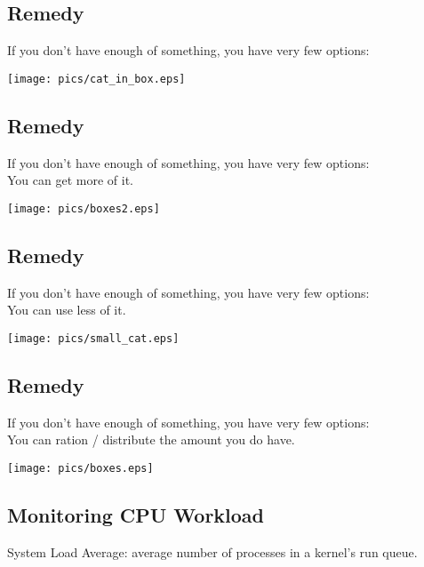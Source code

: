 \documentclass[xga]{xdvislides}
\begin{document}
\subsection{Remedy}
If you don't have enough of something, you have very few options:
\\

\begin{center}
	\texttt{[image: pics/cat\_in\_box.eps]}
\end{center}

\subsection{Remedy}
If you don't have enough of something, you have very few options:
\\

You can get more of it.

\begin{center}
	\texttt{[image: pics/boxes2.eps]}
\end{center}

\subsection{Remedy}
If you don't have enough of something, you have very few options:
\\

You can use less of it.

\begin{center}
	\texttt{[image: pics/small\_cat.eps]}
\end{center}

\subsection{Remedy}
If you don't have enough of something, you have very few options:
\\

You can ration / distribute the amount you do have.

\begin{center}
	\texttt{[image: pics/boxes.eps]}
\end{center}

\subsection{Monitoring CPU Workload}
System Load Average: average number of processes in a kernel's run queue. \\
\end{document}
